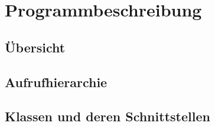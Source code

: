 \chapter{Programmbeschreibung}
\label{Programmbeschreibung}

\section{Übersicht}


\section{Aufrufhierarchie}


\section{Klassen und deren Schnittstellen}

\subsection{}

\subsection{}

\subsection{}

\subsection{}
